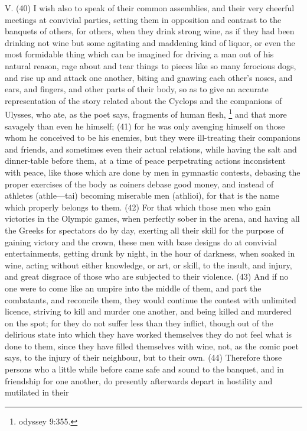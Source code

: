 V. (40) I wish also to speak of their common assemblies, and their very cheerful meetings at
convivial parties, setting them in opposition and contrast to the banquets of others, for others,
when they drink strong wine, as if they had been drinking not wine but some agitating and
maddening kind of liquor, or even the most formidable thing which can be imagined for driving a
man out of his natural reason, rage about and tear things to pieces like so many ferocious dogs,
and rise up and attack one another, biting and gnawing each other's noses, and ears, and fingers,
and other parts of their body, so as to give an accurate representation of the story related about
the Cyclops and the companions of Ulysses, who ate, as the poet says, fragments of human
flesh, \footnote{odyssey 9:355.} and that more savagely than even he himself; (41) for he was only avenging
himself on those whom he conceived to be his enemies, but they were ill-treating their companions
and friends, and sometimes even their actual relations, while having the salt and dinner-table
before them, at a time of peace perpetrating actions inconsistent with peace, like those which are
done by men in gymnastic contests, debasing the proper exercises of the body as coiners debase
good money, and instead of athletes (athle—tai) becoming miserable men (athlioi), for that is the
name which properly belongs to them. (42) For that which those men who gain victories in the
Olympic games, when perfectly sober in the arena, and having all the Greeks for spectators do by
day, exerting all their skill for the purpose of gaining victory and the crown, these men with base
designs do at convivial entertainments, getting drunk by night, in the hour of darkness, when
soaked in wine, acting without either knowledge, or art, or skill, to the insult, and injury, and great
disgrace of those who are subjected to their violence. (43) And if no one were to come like an
umpire into the middle of them, and part the combatants, and reconcile them, they would continue
the contest with unlimited licence, striving to kill and murder one another, and being killed and
murdered on the spot; for they do not suffer less than they inflict, though out of the delirious state
into which they have worked themselves they do not feel what is done to them, since they have
filled themselves with wine, not, as the comic poet says, to the injury of their neighbour, but to their
own. (44) Therefore those persons who a little while before came safe and sound to the banquet,
and in friendship for one another, do presently afterwards depart in hostility and mutilated in their
